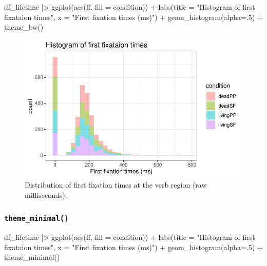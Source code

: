 \documentclass[
  letterpaper,
  DIV=11,
  numbers=noendperiod]{scrartcl}
\newenvironment{Shaded}{\begin{snugshade}}{\end{snugshade}}
\newcommand{\AttributeTok}[1]{\textcolor[rgb]{0.40,0.45,0.13}{#1}}
\newcommand{\DecValTok}[1]{\textcolor[rgb]{0.68,0.00,0.00}{#1}}
\newcommand{\FunctionTok}[1]{\textcolor[rgb]{0.28,0.35,0.67}{#1}}
\newcommand{\NormalTok}[1]{\textcolor[rgb]{0.00,0.23,0.31}{#1}}
\newcommand{\SpecialCharTok}[1]{\textcolor[rgb]{0.37,0.37,0.37}{#1}}
\newcommand{\StringTok}[1]{\textcolor[rgb]{0.13,0.47,0.30}{#1}}
\begin{document}
\begin{Shaded}
\begin{Highlighting}[numbers=left,,]
\NormalTok{df\_lifetime }\SpecialCharTok{|\textgreater{}} \FunctionTok{ggplot}\NormalTok{(}\FunctionTok{aes}\NormalTok{(ff, }\AttributeTok{fill =}\NormalTok{ condition)) }\SpecialCharTok{+} 
  \FunctionTok{labs}\NormalTok{(}\AttributeTok{title =} \StringTok{"Histogram of first fixataion times"}\NormalTok{,}
       \AttributeTok{x =} \StringTok{"First fixation times (ms)"}\NormalTok{) }\SpecialCharTok{+}
  \FunctionTok{geom\_histogram}\NormalTok{(}\AttributeTok{alpha=}\NormalTok{.}\DecValTok{5}\NormalTok{) }\SpecialCharTok{+}
  \FunctionTok{theme\_bw}\NormalTok{()}
\end{Highlighting}
\end{Shaded}

\begin{figure}[H]

{\centering \includegraphics{_data_viz_files/figure-pdf/unnamed-chunk-15-1.pdf}

}

\caption{Distribution of first fixation times at the verb region (raw
milliseconds).}

\end{figure}

\subsubsection{\texorpdfstring{\texttt{theme\_minimal()}}{theme\_minimal()}}

\begin{Shaded}
\begin{Highlighting}[numbers=left,,]
\NormalTok{df\_lifetime }\SpecialCharTok{|\textgreater{}} \FunctionTok{ggplot}\NormalTok{(}\FunctionTok{aes}\NormalTok{(ff, }\AttributeTok{fill =}\NormalTok{ condition)) }\SpecialCharTok{+} 
  \FunctionTok{labs}\NormalTok{(}\AttributeTok{title =} \StringTok{"Histogram of first fixataion times"}\NormalTok{,}
       \AttributeTok{x =} \StringTok{"First fixation times (ms)"}\NormalTok{) }\SpecialCharTok{+}
  \FunctionTok{geom\_histogram}\NormalTok{(}\AttributeTok{alpha=}\NormalTok{.}\DecValTok{5}\NormalTok{) }\SpecialCharTok{+}
  \FunctionTok{theme\_minimal}\NormalTok{()}
\end{Highlighting}
\end{Shaded}
\end{document}
